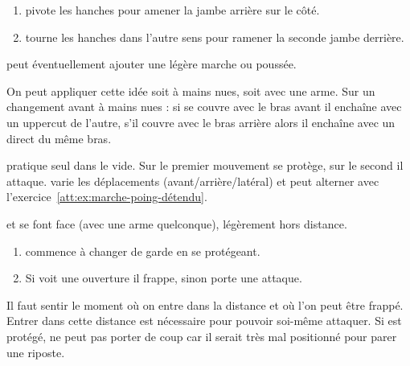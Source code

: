 \begin{technique}
\label{att:tech:changement-garde-2-temps-latéral}

\begin{enumerate}
	\item \A pivote les hanches pour amener la jambe arrière sur le côté.
	
	\item \A tourne les hanches dans l'autre sens pour ramener la seconde jambe derrière.
\end{enumerate}

\A peut éventuellement ajouter une légère marche ou poussée.
\end{technique}


On peut appliquer cette idée soit à mains nues, soit avec une arme.
Sur un changement avant à mains nues : si \A se couvre avec le bras avant il enchaîne avec un uppercut de l'autre, s'il couvre avec le bras arrière alors il enchaîne avec un direct du même bras.


\begin{exercice}
\label{att:ex:changement-garde-2-temps-vide}

\A pratique seul dans le vide.
Sur le premier mouvement \A se protège, sur le second il attaque.
\A varie les déplacements (avant/arrière/latéral) et peut alterner avec l'exercice~\ref{att:ex:marche-poing-détendu}.
\end{exercice}



\begin{exercice}
\label{att:ex:changement-garde-2-temps-test}

\A et \D se font face (avec une arme quelconque), légèrement hors distance.

\begin{enumerate}
	\item \A commence à changer de garde en se protégeant.
	
	\item Si \D voit une ouverture il frappe, sinon \A porte une attaque.
\end{enumerate}

Il faut sentir le moment où on entre dans la distance et où l'on peut être frappé.
Entrer dans cette distance est nécessaire pour pouvoir soi-même attaquer.
Si \A est protégé, \D ne peut pas porter de coup car il serait très mal positionné pour parer une riposte.
\end{exercice}


